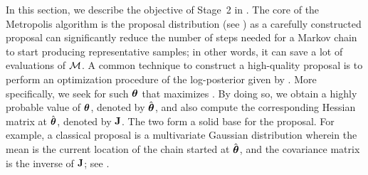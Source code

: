 In this section, we describe the objective of Stage~2 in .
The core of the Metropolis algorithm is the proposal distribution (see ) as a carefully constructed proposal can significantly reduce the number of steps needed for a Markov chain to start producing representative samples; in other words, it can save a lot of evaluations of $\model$.
A common technique to construct a high-quality proposal is to perform an optimization procedure of the log-posterior given by . More specifically, we seek for such ${\boldsymbol\theta}$ that maximizes .
By doing so, we obtain a highly probable value of ${\boldsymbol\theta}$, denoted by $\hat{{\boldsymbol\theta}}$, and also compute the corresponding Hessian matrix at $\hat{{\boldsymbol\theta}}$, denoted by $\mathbf{J}$. The two form a solid base for the proposal.
For example, a classical proposal is a multivariate Gaussian distribution wherein the mean is the current location of the chain started at $\hat{{\boldsymbol\theta}}$, and the covariance matrix is the inverse of $\mathbf{J}$; see \cite{gelman2004, bernardo2007}.
